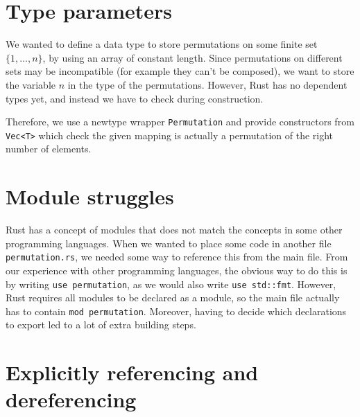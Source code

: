\documentclass{article}
\begin{document}
\section{Type parameters} \label{sec:type_parameters}

We wanted to define a data type to store permutations on some finite set $\{1, \dots, n\}$, by using an array of constant length. Since permutations on different sets may be incompatible (for example they can't be composed), we want to store the variable $n$ in the type of the permutations. However, Rust has no dependent types yet, and instead we have to check during construction.

Therefore, we use a newtype wrapper \texttt{Permutation} and provide constructors from \texttt{Vec<T>} which check the given mapping is actually a permutation of the right number of elements. %

\section{Module struggles}

Rust has a concept of modules that does not match the concepts in some other programming languages. When we wanted to place some code in another file \texttt{permutation.rs}, we needed some way to reference this from the main file. From our experience with other programming languages, the obvious way to do this is by writing \texttt{use permutation}, as we would also write \texttt{use std::fmt}. However, Rust requires all modules to be declared as a module, so the main file actually has to contain \texttt{mod permutation}.
Moreover, having to decide which declarations to export led to a lot of extra building steps.

\section{Explicitly referencing and dereferencing}
\end{document}
